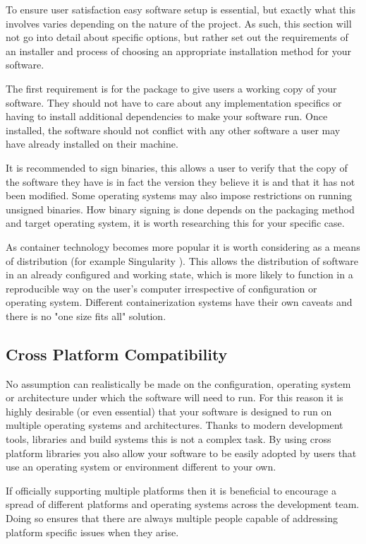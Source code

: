 \documentclass[jnr]{iosart2x}
\begin{document}
To ensure user satisfaction easy software setup is essential, but exactly what this involves varies depending on the nature of the project.
As such, this section will not go into detail about specific options, but rather set out the requirements of an installer and process of choosing an appropriate installation method for your software.

The first requirement is for the package to give users a working copy of your software.
They should not have to care about any implementation specifics or having to install additional dependencies to make your software run.
Once installed, the software should not conflict with any other software a user may have already installed on their machine.

It is recommended to sign binaries, this allows a user to verify that the copy of the software they have is in fact the version they believe it is and that it has not been modified.
Some operating systems may also impose restrictions on running unsigned binaries.
How binary signing is done depends on the packaging method and target operating system, it is worth researching this for your specific case.

As container technology becomes more popular it is worth considering as a means of distribution (for example Singularity \cite{Kurtzer_2017}).
This allows the distribution of software in an already configured and working state, which is more likely to function in a reproducible way on the user's computer irrespective of configuration or operating system.
Different containerization systems have their own caveats and there is no "one size fits all" solution.

\subsection{Cross Platform Compatibility}
\label{Cross platform}

No assumption can realistically be made on the configuration, operating system or architecture under which the software will need to run.
For this reason it is highly desirable (or even essential) that your software is designed to run on multiple operating systems and architectures.
Thanks to modern development tools, libraries and build systems this is not a complex task.
By using cross platform libraries you also allow your software to be easily adopted by users that use an operating system or environment different to your own.

If officially supporting multiple platforms then it is beneficial to encourage a spread of different platforms and operating systems across the development team.
Doing so ensures that there are always multiple people capable of addressing platform specific issues when they arise.
\end{document}
